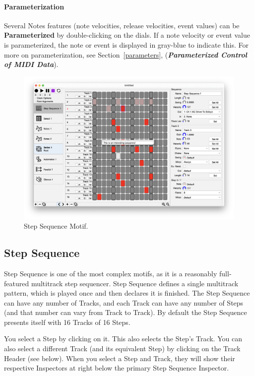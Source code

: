 \documentclass[twoside,10pt]{article}
\begin{document}
\paragraph{Parameterization}

Several Notes features (note velocities, release velocities, event values) can be {\bf Parameterized} by double-clicking on the dials.  If a note velocity or event value is parameterized, the note or event is displayed in gray-blue to indicate this.  For more on parameterization, see Section~\ref{parameters}, (\textbf{\textit{Parameterized Control of MIDI Data}}).

\clearpage

\begin{figure}[t]
\centering
\includegraphics[width=6.5in]{StepSequence}
\vspace{-2em}
\caption{Step Sequence Motif.}
\label{stepsequence}
\end{figure}

\subsection{Step Sequence}

Step Sequence is one of the most complex motifs, as it is a reasonably full-featured multitrack step sequencer.  Step Sequence defines a single multitrack pattern, which is played once and then declares it is finished.  The Step Sequence can have any number of Tracks, and each Track can have any number of Steps (and that number can vary from Track to Track).  By default the Step Sequence presents itself with 16 Tracks of 16 Steps.  

You select a Step by clicking on it.  This also selects the Step's Track.  You can also select a different Track (and its equivalent Step) by clicking on the Track Header (see below).  When you select a Step and Track, they will show their respective Inspectors at right below the primary Step Sequence Inspector.
\end{document}
